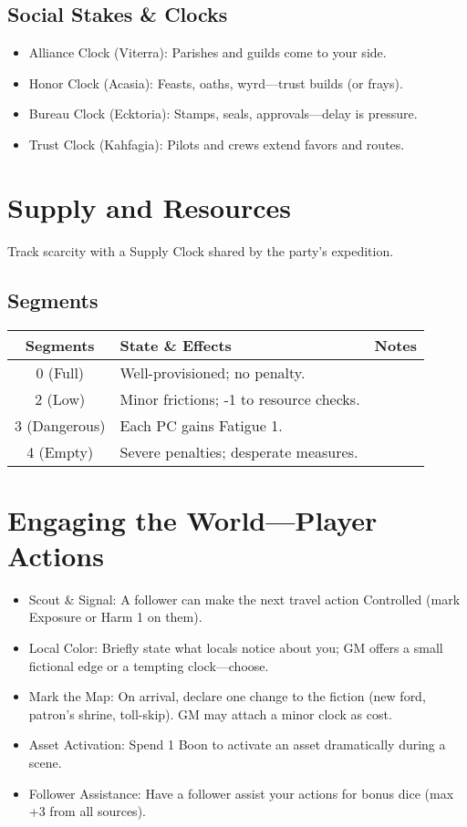\documentclass[11pt,twoside,openany]{book}
\begin{document}
\subsection*{Social Stakes \& Clocks}

\begin{itemize}
\item Alliance Clock (Viterra): Parishes and guilds come to your side.
\item Honor Clock (Acasia): Feasts, oaths, wyrd—trust builds (or frays).
\item Bureau Clock (Ecktoria): Stamps, seals, approvals—delay is pressure.
\item Trust Clock (Kahfagia): Pilots and crews extend favors and routes.
\end{itemize}

\section*{Supply and Resources} 

Track scarcity with a Supply Clock shared by the party's expedition.

\subsection*{Segments}

\begin{center}
\begin{tabular}{|c|l|l|}
\hline
\textbf{Segments} & \textbf{State \& Effects} & \textbf{Notes} \\
\hline
0 (Full) & Well-provisioned; no penalty. & \\
2 (Low) & Minor frictions; -1 to resource checks. & \\
3 (Dangerous) & Each PC gains Fatigue 1. & \\
4 (Empty) & Severe penalties; desperate measures. & \\
\hline
\end{tabular}
\end{center}

\section*{Engaging the World—Player Actions} 

\begin{itemize}
\item Scout \& Signal: A follower can make the next travel action Controlled (mark Exposure or Harm 1 on them).
\item Local Color: Briefly state what locals notice about you; GM offers a small fictional edge or a tempting clock—choose.
\item Mark the Map: On arrival, declare one change to the fiction (new ford, patron's shrine, toll-skip). GM may attach a minor clock as cost.
\item Asset Activation: Spend 1 Boon to activate an asset dramatically during a scene.
\item Follower Assistance: Have a follower assist your actions for bonus dice (max +3 from all sources).
\end{itemize}
\end{document}
